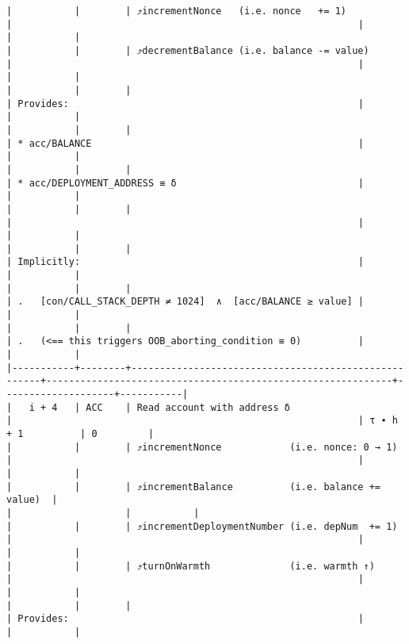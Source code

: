 \documentclass[varwidth=\maxdimen,margin=0.5cm,multi={verbatim}]{standalone}
\begin{document}
\begin{verbatim}
|           |        | ⤴️incrementNonce   (i.e. nonce   += 1)               |                                                             |                    |           |
|           |        | ⤴️decrementBalance (i.e. balance -= value)           |                                                             |                    |           |
|           |        |                                                      | Provides:                                                   |                    |           |
|           |        |                                                      | * acc/BALANCE                                               |                    |           |
|           |        |                                                      | * acc/DEPLOYMENT_ADDRESS ≡ δ                                |                    |           |
|           |        |                                                      |                                                             |                    |           |
|           |        |                                                      | Implicitly:                                                 |                    |           |
|           |        |                                                      | .   [con/CALL_STACK_DEPTH ≠ 1024]  ∧  [acc/BALANCE ≥ value] |                    |           |
|           |        |                                                      | .   (<== this triggers OOB_aborting_condition ≡ 0)          |                    |           |
|-----------+--------+------------------------------------------------------+-------------------------------------------------------------+--------------------+-----------|
|   i + 4   | ACC    | Read account with address δ                          |                                                             | τ ∙ h + 1          | 0         |
|           |        | ⤴️incrementNonce            (i.e. nonce: 0 → 1)      |                                                             |                    |           |
|           |        | ⤴️incrementBalance          (i.e. balance += value)  |                                                             |                    |           |
|           |        | ⤴️incrementDeploymentNumber (i.e. depNum  += 1)      |                                                             |                    |           |
|           |        | ⤴️turnOnWarmth              (i.e. warmth ↑)          |                                                             |                    |           |
|           |        |                                                      | Provides:                                                   |                    |           |

\end{verbatim}
\end{document}
